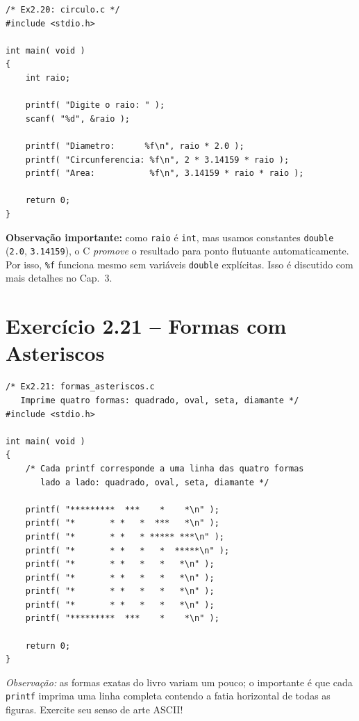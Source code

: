 \documentclass[12pt,a4paper]{article}
\begin{document}
\begin{respostabox}
\begin{lstlisting}
/* Ex2.20: circulo.c */
#include <stdio.h>

int main( void )
{
    int raio;

    printf( "Digite o raio: " );
    scanf( "%d", &raio );

    printf( "Diametro:      %f\n", raio * 2.0 );
    printf( "Circunferencia: %f\n", 2 * 3.14159 * raio );
    printf( "Area:           %f\n", 3.14159 * raio * raio );

    return 0;
}
\end{lstlisting}

\textbf{Observação importante:} como \texttt{raio} é \texttt{int}, mas usamos
constantes \texttt{double} (\texttt{2.0}, \texttt{3.14159}), o C \textit{promove}
o resultado para ponto flutuante automaticamente. Por isso, \texttt{\%f} funciona
mesmo sem variáveis \texttt{double} explícitas. Isso é discutido com mais
detalhes no Cap.~3.
\end{respostabox}

\newpage

\section{Exercício 2.21 -- Formas com Asteriscos}

\begin{respostabox}
\begin{lstlisting}
/* Ex2.21: formas_asteriscos.c
   Imprime quatro formas: quadrado, oval, seta, diamante */
#include <stdio.h>

int main( void )
{
    /* Cada printf corresponde a uma linha das quatro formas
       lado a lado: quadrado, oval, seta, diamante */

    printf( "*********  ***    *    *\n" );
    printf( "*       * *   *  ***   *\n" );
    printf( "*       * *   * ***** ***\n" );
    printf( "*       * *   *   *  *****\n" );
    printf( "*       * *   *   *   *\n" );
    printf( "*       * *   *   *   *\n" );
    printf( "*       * *   *   *   *\n" );
    printf( "*       * *   *   *   *\n" );
    printf( "*********  ***    *    *\n" );

    return 0;
}
\end{lstlisting}

\textit{Observação:} as formas exatas do livro variam um pouco; o importante é
que cada \texttt{printf} imprima uma linha completa contendo a fatia horizontal
de todas as figuras. Exercite seu senso de arte ASCII!
\end{respostabox}
\end{document}
